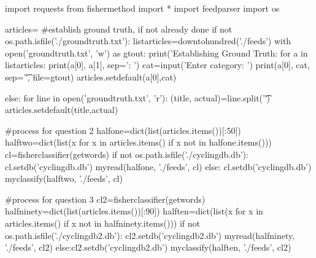 \documentclass[12pt, letterpaper]{article}
\begin{document}
\begin{MyPython}[caption= Feed Classify, label=lst:feedclassify]
import requests
from fishermethod import *
import feedparser
import os

articles={}
#establish ground truth, if not already done
if not os.path.isfile('./groundtruth.txt'):
    listarticles=downtohundred('./feeds')
    with open('groundtruth.txt', 'w') as gtout:
        print('Establishing Ground Truth: %
        for a in listarticles:
            print(a[0], a[1], sep=': ')
            cat=input('Enter category: ')
            print(a[0], cat, sep='\t', file=gtout)
            articles.setdefault(a[0],cat)

else:
    for line in open('groundtruth.txt', 'r'):
        (title, actual)=line.split('\t')
        articles.setdefault(title,actual)
        
#process for question 2
halfone=dict(list(articles.items())[:50])
halftwo=dict(list(x for x in articles.items() if x not in halfone.items()))
cl=fisherclassifier(getwords)
if not os.path.isfile('./cyclingdb.db'):
    cl.setdb('cyclingdb.db')
    myread(halfone, './feeds', cl)
else: cl.setdb('cyclingdb.db')
myclassify(halftwo, './feeds', cl)

#process for question 3
cl2=fisherclassifier(getwords)
halfninety=dict(list(articles.items())[:90])
halften=dict(list(x for x in articles.items() if x not in halfninety.items()))
if not os.path.isfile('./cyclingdb2.db'):
    cl2.setdb('cyclingdb2.db')
    myread(halfninety, './feeds', cl2)
else:cl2.setdb('cyclingdb2.db')
myclassify(halften, './feeds', cl2)
 
\end{MyPython}
\end{document}
